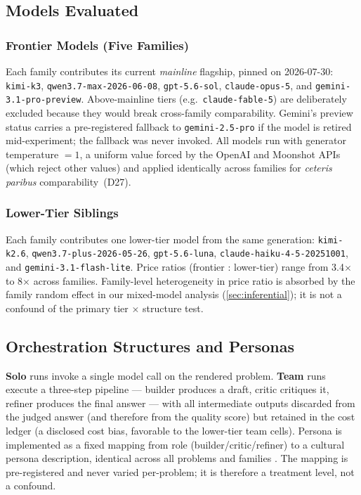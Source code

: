 \documentclass[12pt,a4paper]{article}
\begin{document}
\subsection{Models Evaluated}\label{sec:models}

\subsubsection{Frontier Models (Five Families)}

Each family contributes its current \emph{mainline} flagship, pinned on
2026-07-30: \texttt{kimi-k3}, \texttt{qwen3.7-max-2026-06-08},
\texttt{gpt-5.6-sol}, \texttt{claude-opus-5}, and
\texttt{gemini-3.1-pro-preview}. Above-mainline tiers (e.g.\
\texttt{claude-fable-5}) are deliberately excluded because they would break
cross-family comparability. Gemini's preview status carries a pre-registered
fallback to \texttt{gemini-2.5-pro} if the model is retired mid-experiment; the
fallback was never invoked. All models run with generator temperature $= 1$, a
uniform value forced by the OpenAI and Moonshot APIs (which reject other values)
and applied identically across families for \emph{ceteris paribus}
comparability~(D27).

\subsubsection{Lower-Tier Siblings}

Each family contributes one lower-tier model from the same generation:
\texttt{kimi-k2.6}, \texttt{qwen3.7-plus-2026-05-26}, \texttt{gpt-5.6-luna},
\texttt{claude-haiku-4-5-20251001}, and \texttt{gemini-3.1-flash-lite}. Price
ratios (frontier : lower-tier) range from 3.4$\times$ to 8$\times$ across families.
Family-level heterogeneity in price ratio is absorbed by the family random
effect in our mixed-model analysis (\cref{sec:inferential}); it is not a
confound of the primary tier $\times$ structure test.

\subsection{Orchestration Structures and Personas}

\textbf{Solo} runs invoke a single model call on the rendered problem.
\textbf{Team} runs execute a three-step pipeline --- builder produces a draft,
critic critiques it, refiner produces the final answer --- with all intermediate
outputs discarded from the judged answer (and therefore from the quality score)
but retained in the cost ledger (a disclosed cost bias, favorable to the
lower-tier team cells). Persona is implemented as a fixed mapping from role
(builder/critic/refiner) to a cultural persona description, identical across all
problems and families \citep{Hariri2026b}. The mapping is pre-registered and
never varied per-problem; it is therefore a treatment level, not a confound.
\end{document}
